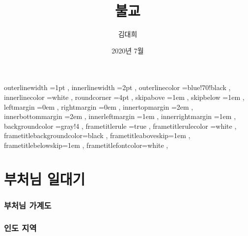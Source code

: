 \documentclass[12pt, a4paper, oneside]{book}
\let\stdsection\section
\renewcommand\section{\newpage\stdsection}
\begin{document}
	
			\dominitoc
			\doparttoc			




			\title{ 불교 }
			\author{김대희}
			\date{ 2020년 7월 }
			\maketitle


			\tableofcontents 		%
			\cleardoublepage
			\listoftables 			%





		 {
						outerlinewidth		=1pt			,%
						innerlinewidth		=2pt			,%
						outerlinecolor		=blue!70!black	,%
						innerlinecolor		=white 			,%
						roundcorner			=4pt			,%
						skipabove			=1em 			,%
						skipbelow			=1em 			,%
						leftmargin			=0em			,%
						rightmargin			=0em			,%
						innertopmargin		=2em 			,%
						innerbottommargin 	=2em 			,%
						innerleftmargin		=1em 			,%
						innerrightmargin		=1em 			,%
						backgroundcolor		=gray!4			,%
						frametitlerule		=true 			,%
						frametitlerulecolor	=white			,%
						frametitlebackgroundcolor=black		,%
						frametitleaboveskip=1em 			,%
						frametitlebelowskip=1em 			,%
						frametitlefontcolor=white 			,%
						}



	\part{ 부처님 일대기 }
	\noptcrule
	\parttoc				

%										
	\section{ 	부처님 가계도	}							
										
%										
	\section{ 	인도 지역	}							
										
\end{document}
